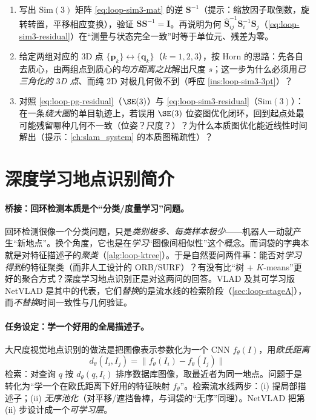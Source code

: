 \begin{practice}
\begin{enumerate}
  \item 写出 $\mathrm{Sim}(3)$ 矩阵 \cref{eq:loop-sim3-mat} 的逆 $\mathbf S^{-1}$（提示：缩放因子取倒数，旋转转置，平移相应变换），验证 $\mathbf S\mathbf S^{-1}=\mathbf I$。再说明为何 $\hat{\mathbf S}_{ij}^{-1}\mathbf S_i^{-1}\mathbf S_j$（\cref{eq:loop-sim3-residual}）在“测量与状态完全一致”时等于单位元、残差为零。
  \item 给定两组对应的 $3$D 点 $\{\mathbf p_k\}\leftrightarrow\{\mathbf q_k\}$（$k=1,2,3$），按 Horn\cite{horn1987closed} 的思路：先各自去质心，由两组点到质心的\emph{均方距离之比}解出尺度 $s$；这一步为什么必须用\emph{已三角化的 $3$D 点}、而纯 $2$D 对极几何做不到（呼应 \cref{ins:loop-sim3-3pt}）？
  \item 对照 \cref{eq:loop-pg-residual}（$\SE(3)$）与 \cref{eq:loop-sim3-residual}（$\mathrm{Sim}(3)$）：在一条\emph{绕大圈}的单目轨迹上，若误用 $\SE(3)$ 位姿图优化闭环，回到起点处最可能残留哪种几何不一致（位姿？尺度？）？为什么本质图优化能近线性时间解出（提示：\cref{ch:slam_system} 的本质图稀疏性）？
\end{enumerate}
\end{practice}

\section{深度学习地点识别简介}
\label{sec:loop-dl}

\paragraph{桥接：回环检测本质是个“分类/度量学习”问题。}
回环检测很像一个分类问题，只是\emph{类别极多、每类样本极少}\cite{gaoxiang2019slam14}——机器人一动就产生“新地点”。换个角度，它也是在\emph{学习}“图像间相似性”这个概念。而词袋的字典本就是对特征描述子的\emph{聚类}（\cref{alg:loop-ktree}）。于是自然要问两件事：能否对\emph{学习得到}的特征聚类（而非人工设计的 ORB/SURF）？有没有比“树 + $K$-means”更好的聚合方式？深度学习地点识别正是对这两问的回答。VLAD 及其可学习版 NetVLAD\cite{arandjelovic2016netvlad} 是其中的代表，它们\emph{替换}的是流水线的检索阶段（\cref{sec:loop-stageA}），而\emph{不替换}时间一致性与几何验证。

\paragraph{任务设定：学一个好用的全局描述子。}
大尺度视觉地点识别的做法\cite{arandjelovic2016netvlad}是把图像表示参数化为一个 CNN $f_\theta(I)$，用\emph{欧氏距离}
\begin{equation}
  d_\theta(I_i,I_j)=\lVert f_\theta(I_i)-f_\theta(I_j)\rVert
  \label{eq:loop-netvlad-dist}
\end{equation}
检索：对查询 $q$ 按 $d_\theta(q,I_i)$ 排序数据库图像，取最近者为同一地点。问题于是转化为“学一个在欧氏距离下好用的特征映射 $f_\theta$”。检索流水线两步：(i) 提局部描述子；(ii) \emph{无序池化}（对平移/遮挡鲁棒，与词袋的“无序”同理）。NetVLAD 把第 (ii) 步设计成一个\emph{可学习层}。

